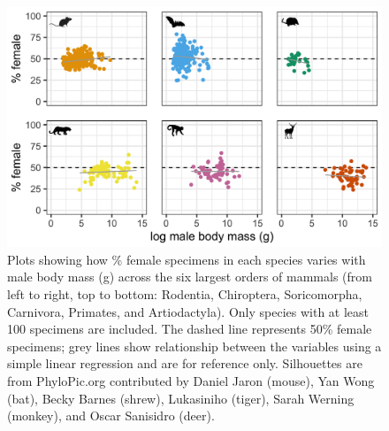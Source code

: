 \documentclass[a4paper, 12pt]{article}
\begin{document}
\begin{figure}
 \centering
  \includegraphics[width = \linewidth]{figures/mass-orders-mammals.png}
  \caption{Plots showing how \% female specimens in each species varies with male body mass (g) across the six largest orders of mammals (from left to right, top to bottom: Rodentia, Chiroptera, Soricomorpha, Carnivora, Primates, and Artiodactyla). 
  Only species with at least 100 specimens are included. 
  The dashed line represents 50\% female specimens; grey lines show relationship between the variables using a simple linear regression and are for reference only. 
  Silhouettes are from PhyloPic.org contributed by Daniel Jaron (mouse), Yan Wong (bat), Becky Barnes (shrew), Lukasiniho (tiger), Sarah Werning (monkey), and Oscar Sanisidro (deer).}
  \label{fig-mammal-male-mass}
\end{figure}
\end{document}
